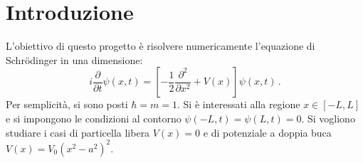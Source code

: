 \documentclass[a4paper, titlepage]{article}
\begin{document}

\newcommand{\sch}[0]{Schrödinger }

\section{Introduzione}
L'obiettivo di questo progetto è risolvere numericamente l'equazione di Schrödinger in una dimensione:
\begin{equation}
    i\frac{\partial}{\partial t}\psi(x,t) = \left[-\frac{1}{2}\frac{\partial^2}{\partial x^2} + V(x)\right]\psi(x,t)\, .
    \label{eq:sch}
\end{equation}
Per semplicità, si sono posti $\hbar = m = 1$. Si è interessati alla regione $x \in [-L,L]$ e si impongono le condizioni al contorno $\psi(-L,t) = \psi(L,t) = 0$. Si vogliono studiare i casi di particella libera $V(x) = 0$ e di potenziale a doppia buca $V(x) = V_0(x^2-a^2)^2$.
\end{document}
